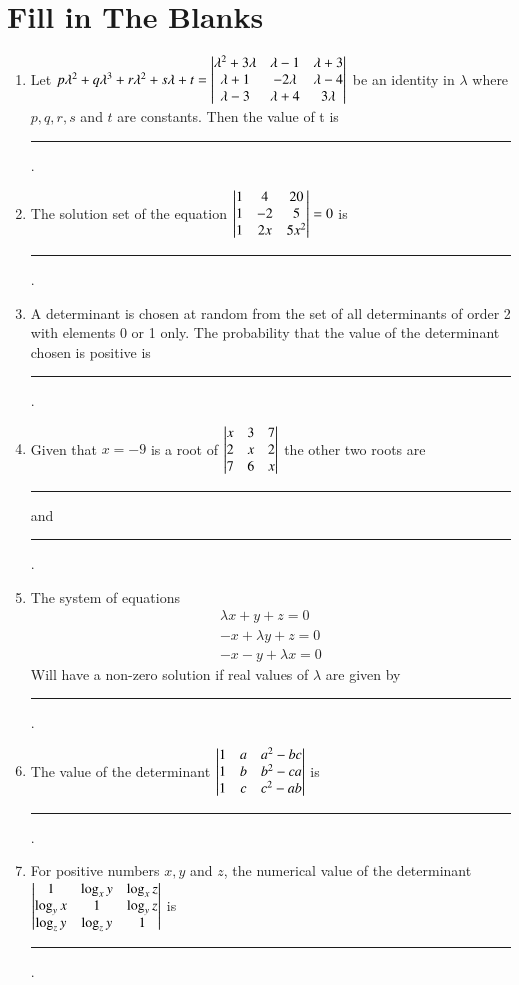 \documentclass[journal,12pt,twocolumn]{IEEEtran}
\theoremstyle{remark}
\begin{document}
\section{Fill in The Blanks}
\begin{enumerate}[label=\arabic*.]
	\item Let $p\lambda^2 + q\lambda^3 + r\lambda^2 + s\lambda + t =
		\begin{vmatrix}
			\lambda^2 + 3\lambda & \lambda - 1 & \lambda + 3 \\
			\lambda + 1 & -2\lambda & \lambda - 4 \\
			\lambda - 3 & \lambda+ 4 & 3\lambda
		\end{vmatrix}$ be an identity in $\lambda$ where $p, q, r, s$ and $t$ are constants.
		Then the value of t is \rule{1cm}{0.15mm}.
		\hfill {}
	
	\item The solution set of the equation $\begin{vmatrix}
			1 & 4 & 20 \\
			1 & -2 & 5 \\
			1 & 2x & 5x^2
		\end{vmatrix} = 0$ is \rule{1cm}{0.15mm}.
		\hfill {}

	\item A determinant is chosen at random from the set of all determinants of order
		2 with elements 0 or 1 only. The probability that the value of the determinant
		chosen is positive is \rule{1cm}{0.15mm}.
		\hfill {}

	\item Given that $x = -9$ is a root of $\begin{vmatrix}
			x & 3 & 7 \\
			2 & x & 2 \\
			7 & 6 & x
		\end{vmatrix}$ the other two roots are \rule{1cm}{0.15mm} and \rule{1cm}{0.15mm}.
		\hfill {}

	\item The system of equations
		\begin{gather*}
			\lambda x + y + z = 0 \\
			-x + \lambda y + z = 0 \\
			-x - y + \lambda x = 0
		\end{gather*}
		Will have a non-zero solution if real values of $\lambda$ are given by
		\rule{1cm}{0.15mm}.
		\hfill {}

	\item The value of the determinant $\begin{vmatrix}
			1 & a & a^2 - bc \\
			1 & b & b^2 - ca \\
			1 & c & c^2 - ab
		\end{vmatrix}$ is \rule{1cm}{0.15mm}.	
		\hfill {}

	\item For positive numbers $x, y$ and $z$, the numerical value of the determinant
		$\begin{vmatrix}
			1 & \log_x{y} & \log_x{z} \\
			\log_y{x} & 1 & \log_y{z} \\
			\log_z{y} & \log_z{y} & 1 \\
		\end{vmatrix}$ is \rule{1cm}{0.15mm}.
		\hfill {}
\end{enumerate}
\end{document}
